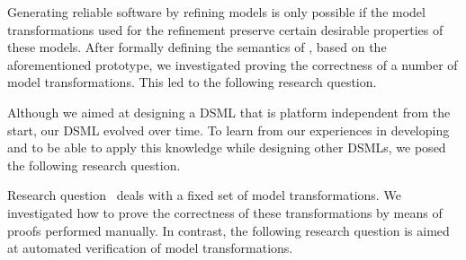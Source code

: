 \RQThree


Generating reliable software by refining models is only possible if the model transformations used for the refinement preserve certain desirable properties of these models.
After formally defining the semantics of \SLCO, based on the aforementioned prototype, we investigated proving the correctness of a number of model transformations.
This led to the following research question.

\RQFour


Although we aimed at designing a DSML that is platform independent from the start, our DSML evolved over time.
To learn from our experiences in developing \SLCO and to be able to apply this knowledge while designing other DSMLs, we posed the following research question.

\RQFive


Research question~ deals with a fixed set of model transformations.
We investigated how to prove the correctness of these transformations by means of proofs performed manually.
In contrast, the following research question is aimed at automated verification of model transformations.

\RQSix 